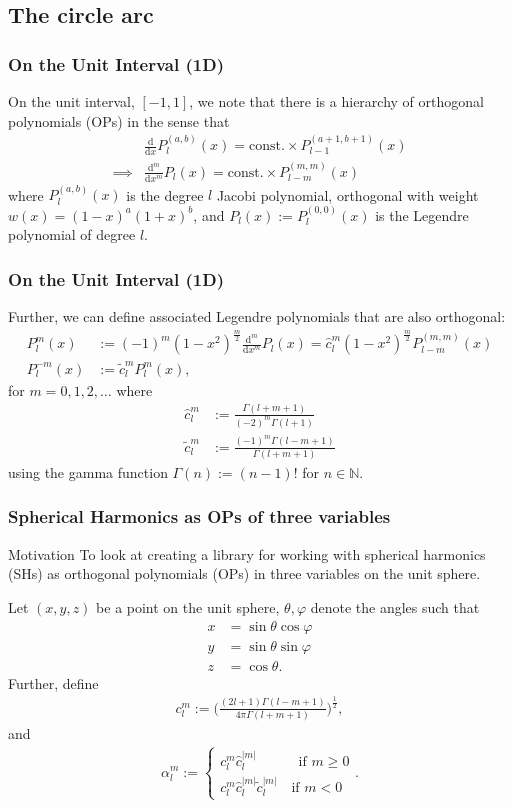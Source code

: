 \documentclass[10pt]{beamer}
\newcommand{\N}{\mathbb{N}}
\newcommand{\Plm}{P^m_l}
\newcommand{\costheta}{\cos\theta}
\newcommand{\sintheta}{\sin\theta}
\newcommand{\cosphi}{\cos\varphi}
\newcommand{\sinphi}{\sin\varphi}
\newcommand{\alphalm}{\alpha^m_l}
\newcommand{\clm}{c^m_l}
\newcommand{\ctilde}{\tilde{c}^m_l}
\newcommand{\ctildemod}{\tilde{c}^{|m|}_l}
\newcommand{\chat}{\hat{c}^m_l}
\newcommand{\chatmod}{\hat{c}^{|m|}_l}
\newcommand{\ddx}{\frac{\mathrm{d}}{\mathrm{d}x}}
\newcommand{\dmdxm}{\frac{\mathrm{d}^m}{\mathrm{d}x^m}}
\begin{document}
\subsection{The circle arc}


\frame
{
  \frametitle{On the Unit Interval (1D)}

On the unit interval, \([-1,1]\), we note that there is a hierarchy of orthogonal polynomials (OPs) in the sense that
\begin{align}
& \ddx P^{(a,b)}_l (x) = \text{const.} \times P^{(a+1,b+1)}_{l-1}(x) \\
\implies & \dmdxm P_l(x) = \text{const.} \times P^{(m,m)}_{l-m}(x)
\end{align}
where \(P^{(a,b)}_l (x)\) is the degree \(l\) Jacobi polynomial, orthogonal with weight \(w(x) = (1-x)^a(1+x)^b\), and \(P_l(x) := P^{(0,0)}_l (x)\) is the Legendre polynomial of degree \(l\).

}

\frame
{
  \frametitle{On the Unit Interval (1D)}

Further, we can define associated Legendre polynomials that are also orthogonal:
\begin{align}
\Plm(x) &:= (-1)^m (1-x^2)^\frac{m}{2} \dmdxm P_l(x) = \chat (1-x^2)^\frac{m}{2} P^{(m,m)}_{l-m}(x) \\
P^{-m}_l(x) &:= \ctilde \Plm(x),
\end{align}
for \(m = 0,1,2,\ldots\) where
\begin{align}
\chat &:= \frac{\Gamma(l+m+1)}{(-2)^m\Gamma(l+1)} \\
\ctilde &:= \frac{(-1)^m\Gamma(l-m+1)}{\Gamma(l+m+1)}
\end{align}
using the gamma function \(\Gamma(n) := (n-1)!\) for \(n \in \N\).

}

\frame
{
    \frametitle{Spherical Harmonics as OPs of three variables}
    
\begin{block}{Motivation}
To look at creating a library for working with spherical harmonics (SHs) as orthogonal polynomials (OPs) in three variables on the unit sphere.
\end{block}

Let \((x,y,z)\) be a point on the unit sphere, \(\theta, \varphi\) denote the angles such that
\begin{align}
x &= \sintheta \cosphi \\
y &= \sintheta \sinphi \\
z &= \costheta.
\end{align}
Further, define
\begin{align}
\clm := \Bigg(\frac{(2l+1)\Gamma(l-m+1)}{4\pi\Gamma(l+m+1)}\Bigg)^\frac{1}{2},
\end{align}
and
\begin{align}
\alphalm := \begin{cases} 
		\clm \chatmod \quad \quad \quad \text{if } m \ge 0 \\
		\clm \chatmod \ctildemod \quad \text{if } m < 0
	   \end{cases}.
\end{align}

}
\end{document}
